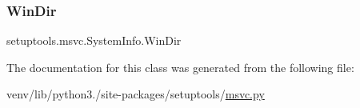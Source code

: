 \subsubsection{\texorpdfstring{Win\+Dir}{WinDir}}
{\footnotesize\ttfamily setuptools.\+msvc.\+System\+Info.\+Win\+Dir\hspace{0.3cm}{\ttfamily [static]}}



The documentation for this class was generated from the following file\+:\begin{DoxyCompactItemize}
\item 
venv/lib/python3./site-\/packages/setuptools/\hyperlink{msvc_8py}{msvc.\+py}\end{DoxyCompactItemize}
